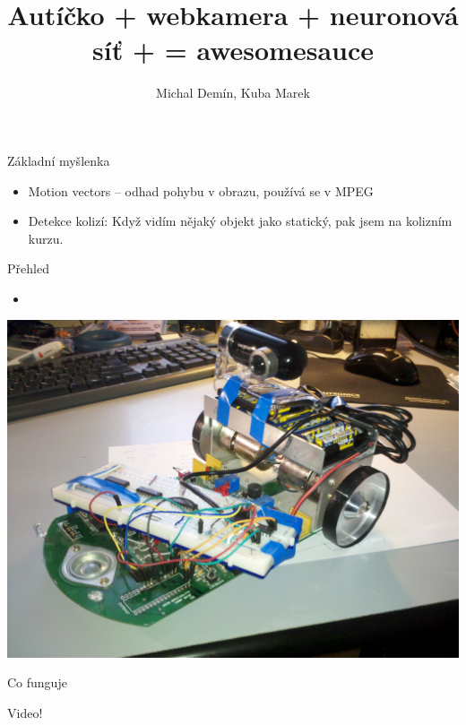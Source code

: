 \documentclass{beamer}
\title{Autíčko + webkamera + neuronová síť + = awesomesauce}
\author{Michal Demín, Kuba Marek}
\date{}
\begin{document}
\begin{frame}[plain]
\titlepage
\end{frame}

\begin{frame}{Základní myšlenka}
\begin{itemize}
\item Motion vectors -- odhad pohybu v obrazu, používá se v MPEG
\item Detekce kolizí:
Když vidím nějaký objekt jako statický, pak jsem na kolizním kurzu.
\end{itemize}
\end{frame}

\begin{frame}{Přehled}
\begin{itemize}
\item
\end{itemize}
\end{frame}

\hspace{-1.39cm}
\begin{frame}[plain]
\begin{centering}
\includegraphics[width=1.05\paperwidth]{img1.jpg}
\end{centering}
\end{frame}

\begin{frame}{Co funguje}
\end{frame}

\begin{frame}[plain]
\center
Video!
\end{frame}
\end{document}
